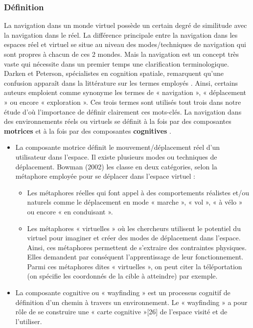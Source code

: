 \subsubsection{Définition}

La navigation dans un monde virtuel possède un certain degré de similitude avec la navigation dans le réel. La différence principale entre la navigation dans les espaces réel et virtuel se situe au niveau des modes/techniques de navigation qui sont propres à chacun de ces 2 mondes. 
Mais la navigation est un concept très vaste qui nécessite dans un premier temps une clarification terminologique. Darken et Peterson, spécialistes en cognition spatiale, remarquent qu'une confusion apparaît dans la littérature sur les termes employés \cite{darken2002spatial}. Ainsi, certains auteurs emploient comme synonyme les termes de « navigation », « déplacement » ou encore « exploration ». Ces trois termes sont utilisés tout trois dans notre étude d’où l’importance de définir clairement ces mots-clés. 
La navigation dans des environnements réels ou virtuels se définit à la fois par des composantes \textbf{motrices} et à la fois par des composantes \textbf{cognitives} \cite{bowman_doug_a_3d_2002}.

\begin{itemize}
  \item La composante motrice définit le mouvement/déplacement réel d’un utilisateur dans l’espace. Il existe plusieurs modes ou techniques de déplacement. Bowman (2002) les classe en deux catégories, selon la métaphore employée pour se déplacer dans l’espace virtuel :
    \begin{itemize}
      \item Les métaphores réelles qui font appel à des comportements réalistes et/ou naturels comme le déplacement en mode « marche », « vol », « à vélo » ou encore « en conduisant ».
      \item Les métaphores « virtuelles » où les chercheurs utilisent le potentiel du virtuel pour imaginer et créer des modes de déplacement dans l’espace. Ainsi, ces métaphores permettent de s’extraire des contraintes physiques. Elles demandent par conséquent l’apprentissage de leur fonctionnement. Parmi ces métaphores dites « virtuelles », on peut citer la téléportation (on spécifie les coordonnés de la cible à atteindre) par exemple.
    \end{itemize}
  \item La composante cognitive ou « wayfinding » est un processus cognitif de définition d’un chemin à travers un environnement. Le « wayfinding » a pour rôle de se construire une « carte cognitive »[26] de l’espace visité et de l’utiliser.
\end{itemize}

